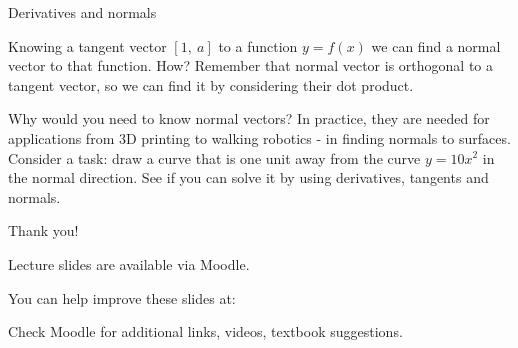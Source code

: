 \documentclass{beamer}
\begin{document}
\begin{frame}{Derivatives and normals}
	\begin{flushleft}
		
		Knowing a tangent vector $[1, \ a]$ to a function $y = f(x)$ we can find a normal vector to that function. How? Remember that normal vector is orthogonal to a tangent vector, so we can find it by considering their dot product.
		
		\bigskip
		
		Why would you need to know normal vectors? In practice, they are needed for applications from 3D printing to walking robotics - in finding normals to surfaces. Consider a task: draw a curve that is one unit away from the curve $y = 10 x^2$ in the normal direction. See if you can solve it by using derivatives, tangents and normals.
		
		
	\end{flushleft}
\end{frame}



\begin{frame}{Thank you!}
\centerline{Lecture slides are available via Moodle.}
\bigskip
\centerline{You can help improve these slides at:}
\centerline{\mygit}
\bigskip
\centerline{Check Moodle for additional links, videos, textbook suggestions.}
\bigskip

\centerline{\textcolor{black}{}}

\end{frame}
\end{document}
